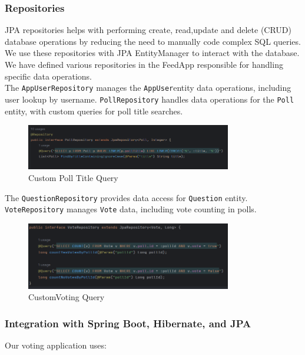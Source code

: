\subsubsection{Repositories}
JPA repositories helps with performing create, read,update and delete (CRUD) database operations by reducing the need to manually code complex SQL queries.  We use these repositories with JPA EntityManager to interact with the database. We have defined various repositories in the FeedApp responsible for handling specific data operations.\\

\noindent The \texttt{AppUserRepository} manages the \texttt{AppUser}entity data operations, including user lookup by username.
\noindent \texttt{PollRepository} handles data operations for the \texttt{Poll} entity, with custom queries for poll title searches.\\

\begin{figure}[h]
  \centering
  \includegraphics[width=0.80\textwidth]{figs/poll_repository.png}
  \caption{Custom Poll Title Query}
  \label{fig:my_label}
\end{figure}

\noindent The \texttt{QuestionRepository} provides data access for \texttt{Question} entity.
\noindent \texttt {VoteRepository} manages \texttt{Vote} data, including vote counting in polls.

\begin{figure}[h]
  \centering
  \includegraphics[width=0.80\textwidth]{figs/vote_repository.png}
  \caption{CustomVoting Query}
  \label{fig:my_label}
\end{figure}

\subsubsection{Integration with Spring Boot, Hibernate, and JPA}
Our voting application uses:

